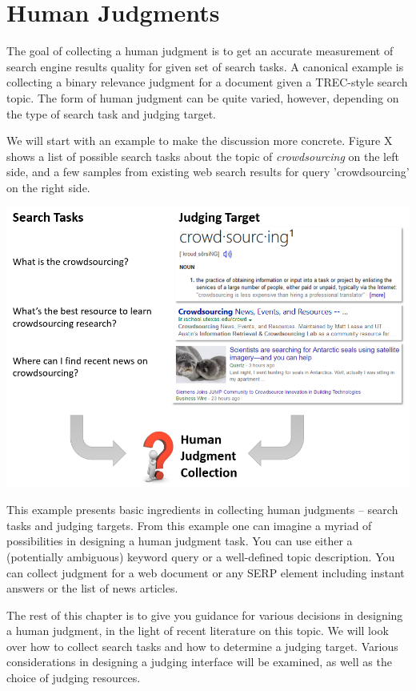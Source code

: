 \documentclass[openany]{now} %
\begin{document}
\chapter{Human Judgments}
\label{c-human-judgment}

The goal of collecting a human judgment is to get an accurate measurement of  search engine results quality for given set of search tasks. A canonical example is collecting a binary relevance judgment for a document given a TREC-style search topic. The form of human judgment can be quite varied, however, depending on the type of search task and judging target.

We will start with an example to make the discussion more concrete. Figure X shows a list of possible search tasks about the topic of \textit{crowdsourcing} on the left side, and a few samples from existing web search results for query 'crowdsourcing' on the right side. 

\includegraphics[scale=0.5]{images/human_judgment_overview}

This example presents basic ingredients in collecting human judgments -- search tasks and judging targets. From this example one can imagine a myriad of possibilities in designing a human judgment task. You can use either a (potentially ambiguous) keyword query or a well-defined topic description. You can collect judgment for a web document or any SERP element including instant answers or the list of news articles. 

The rest of this chapter is to give you guidance for various decisions in designing a human judgment, in the light of recent literature on this topic. We will look over how to collect search tasks and how to determine a judging target. Various considerations in designing a judging interface will be examined, as well as the choice of judging resources.
\end{document}
